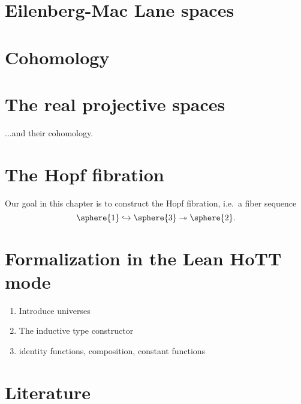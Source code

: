 \documentclass[11pt]{memoir} %
\begin{document}
\chapter{Eilenberg-Mac Lane spaces}

\chapter{Cohomology}

\chapter{The real projective spaces}
...and their cohomology.

\chapter{The Hopf fibration}
Our goal in this chapter is to construct the Hopf fibration, i.e.~a fiber sequence
\begin{equation*}
\sphere{1}\hookrightarrow\sphere{3}\twoheadrightarrow\sphere{2}.
\end{equation*}



\appendix

\chapter{Formalization in the Lean HoTT mode}
\begin{enumerate}
\item Introduce universes
\item The inductive type constructor
\item identity functions, composition, constant functions
\end{enumerate}

\chapter{Literature}

\backmatter
\end{document}
